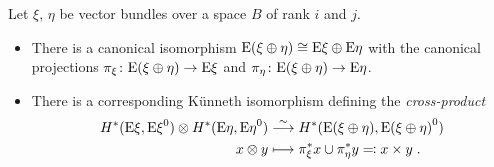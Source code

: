 \begin{Rem}
  Let $\xi$, $\eta$ be vector bundles over a space $B$
  of rank $i$ and $j$.
  \begin{itemize}
  \item There is a canonical isomorphism
    $\mathrm{E}(\xi\oplus\eta)\cong\mathrm{E}\xi\oplus\mathrm{E}\eta$
    with the canonical projections
    $\pi_\xi\colon \mathrm{E}(\xi\oplus\eta)\to \mathrm{E}\xi$
    and
    $\pi_\eta\colon\mathrm{E}(\xi\oplus\eta)\to \mathrm{E}\eta$.
  \item There is a corresponding Künneth isomorphism
    defining the \emph{cross-product} 
  \begin{align*}
    H^*(\mathrm{E}\xi, {\mathrm{E}\xi}^0)
      \otimes
      H^*(\mathrm{E}\eta, {\mathrm{E}\eta}^0)
    &\overset{\sim}{\longrightarrow}
      H^*(\mathrm{E}(\xi\oplus\eta), {\mathrm{E}(\xi\oplus\eta)}^0)\\
    x\otimes y
    &\longmapsto
      {\pi}^*_\xi x \cup {\pi}^*_\eta y
      \eqqcolon x\times y
      \;.
  \end{align*}
  \cite[Theorem~3.18]{hatcher}
  \end{itemize}
\end{Rem}
